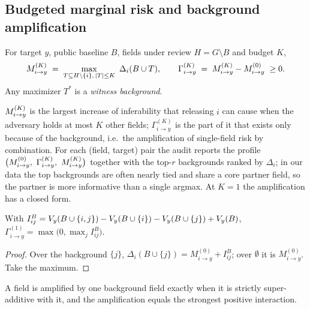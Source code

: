 \subsection{Budgeted marginal risk and background amplification}
\begin{definition}\label{def:mk}
For target $y$, public baseline $B$, fields under review $H=G\setminus B$ and budget $K$,
\begin{equation}\label{eq:mk}
\Mik \;=\; \max_{T \subseteq H \setminus \{i\},\, |T| \le K}\ \Delta_i(B\cup T),
\qquad
\Gamma^{(K)}_{i\to y} \;=\; \Mik - M^{(0)}_{i\to y} \;\ge 0 .
\end{equation}
Any maximizer $T^{*}$ is a \emph{witness background}.
\end{definition}
$M^{(K)}_{i \to y}$ is the largest increase of inferability that releasing $i$ can cause when the adversary
holds at most $K$ other fields; $\Gamma^{(K)}_{i\to y}$ is the part of it that exists only because of
the background, i.e.\ the amplification of single-field risk by combination. For each (field,
target) pair the audit reports the profile $\big(M^{(0)}_{i\to y},\ \Gamma^{(K)}_{i\to y},\ \Mik\big)$
together with the top-$r$ backgrounds ranked by $\Delta_i$; in our data the top backgrounds are
often nearly tied and share a core partner field, so the partner is more informative than a
single argmax. At $K=1$ the amplification has a closed form.

\begin{proposition}[Amplification at $K=1$]\label{prop:k1}
With $I^B_{ij}=V_{y}(B\cup\{i,j\})-V_{y}(B\cup\{i\})-V_{y}(B\cup\{j\})+V_{y}(B)$,
$\Gamma^{(1)}_{i\to y}=\max\big(0,\max_{j} I^{B}_{ij}\big)$.
\end{proposition}
\begin{proof}
Over the background $\{j\}$, $\Delta_i(B\cup\{j\})=M^{(0)}_{i\to y}+I^B_{ij}$; over $\emptyset$ it is
$M^{(0)}_{i\to y}$. Take the maximum.
\end{proof}
A field is amplified by one background field exactly when it is strictly super-additive with it,
and the amplification equals the strongest positive interaction.

